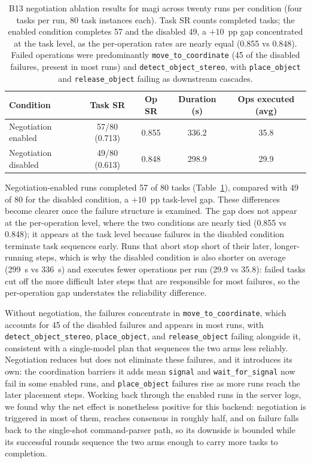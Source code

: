 \begin{table}[t]
	\centering
	\begin{tabular}{lcccc}
		\hline
		\textbf{Condition}   & \textbf{Task SR}      &
		\textbf{Op SR}       & \textbf{Duration (s)} & \textbf{Ops executed (avg)}                \\
		\hline
		Negotiation enabled  & 57/80 (0.713)         & 0.855                       & 336.2 & 35.8 \\
		Negotiation disabled & 49/80 (0.613)         & 0.848                       & 298.9 & 29.9 \\
		\hline
	\end{tabular}
	\caption{B13 negotiation ablation results for \gls{magi} across twenty runs per condition (four tasks per run, 80 task instances each). Task SR counts completed tasks; the enabled condition completes 57 and the disabled 49, a $+10$~pp gap concentrated at the task level, as the per-operation rates are nearly equal (0.855 vs 0.848). Failed operations were predominantly \texttt{move\_to\_coordinate} (45 of the disabled failures, present in most runs) and \texttt{detect\_object\_stereo}, with \texttt{place\_object} and \texttt{release\_object} failing as downstream cascades.}
	\label{tab:b13-results}
\end{table}

Negotiation-enabled runs completed 57 of 80 tasks (Table~\ref{tab:b13-results}), compared with 49 of 80 for the disabled condition, a $+10$~pp task-level gap. These differences become clearer once the failure structure is examined. The gap does not appear at the per-operation level, where the two conditions are nearly tied (0.855 vs 0.848); it appears at the task level because failures in the disabled condition terminate task sequences early. Runs that abort stop short of their later, longer-running steps, which is why the disabled condition is also shorter on average (299~s vs 336~s) and executes fewer operations per run (29.9 vs 35.8): failed tasks cut off the more difficult later steps that are responsible for most failures, so the per-operation gap understates the reliability difference.

Without negotiation, the failures concentrate in \texttt{move\_to\_coordinate}, which accounts for 45 of the disabled failures and appears in most runs, with \texttt{detect\_object\_stereo}, \texttt{place\_object}, and \texttt{release\_object} failing alongside it, consistent with a single-model plan that sequences the two arms less reliably. Negotiation reduces but does not eliminate these failures, and it introduces its own: the coordination barriers it adds mean \texttt{signal} and \texttt{wait\_for\_signal} now fail in some enabled runs, and \texttt{place\_object} failures rise as more runs reach the later placement steps. Working back through the enabled runs in the server logs, we found why the net effect is nonetheless positive for this backend: negotiation is triggered in most of them, reaches consensus in roughly half, and on failure falls back to the single-shot command-parser path, so its downside is bounded while its successful rounds sequence the two arms enough to carry more tasks to completion.

